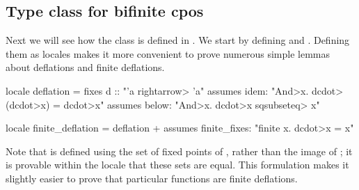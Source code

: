\subsection{Type class for bifinite cpos}

Next we will see how the class  is defined in . We start by defining  and . Defining them as locales makes it more convenient to prove numerous simple lemmas about deflations and finite deflations.
%
\begin{isacode}
locale deflation =
  fixes d :: "'a \<rightarrow> 'a"
  assumes idem: "\<And>x. d\<cdot>(d\<cdot>x) = d\<cdot>x"
  assumes below: "\<And>x. d\<cdot>x \<sqsubseteq> x"
\end{isacode}
\unmedskip
{}
\begin{isacode}
locale finite_deflation = deflation +
  assumes finite_fixes: "finite {x. d\<cdot>x = x}"
\end{isacode}
%
Note that  is defined using the set of fixed points of , rather than the image of ; it is provable within the  locale that these sets are equal. This formulation makes it slightly easier to prove that particular functions are finite deflations.

